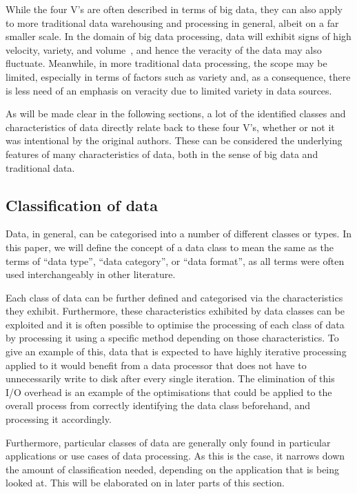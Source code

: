 \documentclass[a4paper,11pt]{article}
\begin{document}
While the four V's are often described in terms of big data, they can also apply to more traditional data
warehousing and processing in general, albeit on a far smaller scale. In the domain of big data processing, data will
exhibit signs of high velocity, variety, and volume~\cite{beyer2011gartner}, and hence the veracity of the data may also fluctuate. Meanwhile,
in more traditional data processing, the scope may be limited, especially in terms of factors such as variety and, as a
consequence, there is less need of an emphasis on veracity due to limited variety in data sources.

As will be made clear in the following sections, a lot of the identified classes and characteristics of data directly
relate back to these four V's, whether or not it was intentional by the original authors. These can be considered the
underlying features of many characteristics of data, both in the sense of big data and traditional data.



\subsection{Classification of data} %
\label{sub:data_classification}

Data, in general, can be categorised into a number of different classes or types. In this paper, we will define the
concept of a data class to mean the same as the terms of ``data type'', ``data category'', or ``data format'', as all
terms were often used interchangeably in other literature.

Each class of data can be further defined and categorised via the characteristics they exhibit. Furthermore, these
characteristics exhibited by data classes can be exploited and it is often possible to optimise the processing of each
class of data by processing it using a specific method depending on those characteristics.%
To give an example
of this, data that is expected to have highly iterative processing applied to it would benefit from a data processor
that does not have to unnecessarily write to disk after every single iteration. The elimination of this I/O overhead is
an example of the optimisations that could be applied to the overall process from correctly identifying the data class
beforehand, and processing it accordingly.

Furthermore, particular classes of data are generally only found in particular applications or use cases of data
processing.%
As this is the case, it narrows down the amount of classification needed, depending on the application that
is being looked at. This will be elaborated on in later parts of this section.
\end{document}
